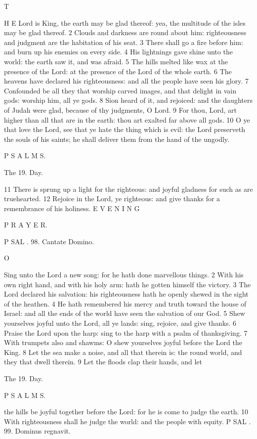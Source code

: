 T

H E Lord is King, the earth may be glad thereof: yea, the multitude of the isles may be glad thereof. 2 Clouds and darkness are round about him: righteousness and judgment are the habitation of his seat. 3 There shall go a fire before him: and burn up his enemies on every side. 4 His lightnings gave shine unto the world: the earth saw it, and was afraid. 5 The hills melted like wax at the presence of the Lord: at the presence of the Lord of the whole earth. 6 The heavens have declared his righteousness: and all the people have seen his glory. 7 Confounded be all they that worship carved images, and that delight in vain gods: worship him, all ye gods. 8 Sion heard of it, and rejoiced: and the daughters of Judah were glad, because of thy judgments, O Lord. 9 For thou, Lord, art higher than all that are in the earth: thou art exalted far above all gods. 10 O ye that love the Lord, see that ye hate the thing which is evil: the Lord preserveth the souls of his saints; he shall deliver them from the hand of the ungodly.

P S A L M S.

The 19. Day.

11 There is sprung up a light for the righteous: and joyful gladness for such as are truehearted. 12 Rejoice in the Lord, ye righteous: and give thanks for a remembrance of his holiness. E V E N I N G

P R A Y E R.

P SAL . 98. Cantate Domino.

O

Sing unto the Lord a new song: for he hath done marvellous things. 2 With his own right hand, and with his holy arm: hath he gotten himself the victory. 3 The Lord declared his salvation: his righteousness hath he openly shewed in the sight of the heathen. 4 He hath remembered his mercy and truth toward the house of Israel: and all the ends of the world have seen the salvation of our God. 5 Shew yourselves joyful unto the Lord, all ye lands: sing, rejoice, and give thanks. 6 Praise the Lord upon the harp: sing to the harp with a psalm of thanksgiving. 7 With trumpets also and shawms: O shew yourselves joyful before the Lord the King. 8 Let the sea make a noise, and all that therein is: the round world, and they that dwell therein. 9 Let the floods clap their hands, and let

The 19. Day.

P S A L M S.

the hills be joyful together before the Lord: for he is come to judge the earth. 10 With righteousness shall he judge the world: and the people with equity. P SAL . 99. Dominus regnavit.

